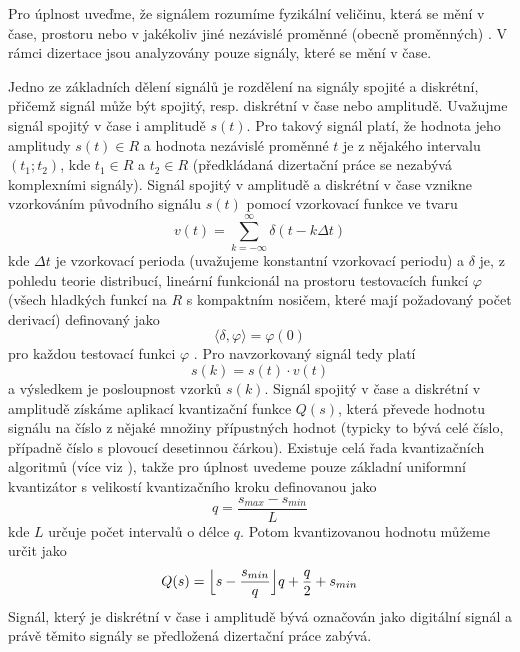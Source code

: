 Pro úplnost uveďme, že signálem rozumíme fyzikální veličinu, která se mění v čase, prostoru nebo v jakékoliv jiné nezávislé proměnné (obecně proměnných) \cite{proakis}. V rámci dizertace jsou analyzovány pouze signály, které se mění v čase.
\par
Jedno ze základních dělení signálů je rozdělení na signály spojité a diskrétní, přičemž signál může být spojitý, resp. diskrétní v čase nebo amplitudě. Uvažujme signál spojitý v čase i amplitudě $s(t)$. Pro takový signál platí, že hodnota jeho amplitudy $s(t)\in R$ a hodnota nezávislé proměnné $t$ je z nějakého intervalu $(t_1;t_2)$, kde $t_1 \in R$ a $t_2 \in R$ (předkládaná dizertační práce se nezabývá komplexními signály). Signál spojitý v amplitudě a diskrétní v čase vznikne vzorkováním původního signálu $s(t)$ pomocí vzorkovací funkce ve tvaru
\begin{equation}
v(t)=\sum_{k=-\infty}^{\infty}\delta(t-k\Delta t)
\end{equation}
kde $\Delta t$ je vzorkovací perioda (uvažujeme konstantní vzorkovací periodu) a $\delta$ je, z pohledu teorie distribucí, lineární funkcionál na prostoru testovacích funkcí $\varphi$ (všech hladkých funkcí na $R$ s kompaktním nosičem, které mají požadovaný počet derivací) definovaný jako
\begin{equation}
\langle \delta,\varphi\rangle=\varphi(0)
\end{equation}
pro každou testovací funkci $\varphi$ \cite{dirac}. Pro navzorkovaný signál tedy platí
\begin{equation}
s(k)=s(t)\cdot v(t)
\end{equation}
a výsledkem je posloupnost vzorků $s(k)$. Signál spojitý v čase a diskrétní v amplitudě získáme aplikací kvantizační funkce $Q(s)$, která převede hodnotu signálu  na číslo z nějaké množiny přípustných hodnot (typicky to bývá celé číslo, případně číslo s plovoucí desetinnou čárkou). Existuje celá řada kvantizačních algoritmů (více viz \cite{kvantizace}), takže pro úplnost uvedeme pouze základní uniformní kvantizátor s velikostí kvantizačního kroku definovanou jako
\begin{equation}
q=\frac{s_{max}-s_{min}}{L}
\end{equation}
kde $L$ určuje počet intervalů o délce $q$. Potom kvantizovanou hodnotu můžeme určit jako
\begin{equation}
Q(s)=\Bigl \lfloor s-\frac{s_{min}}{q}\Bigr \rfloor q+\frac{q}{2}+s_{min}
\end{equation}
Signál, který je diskrétní v čase i amplitudě bývá označován jako digitální signál a právě těmito signály se předložená dizertační práce zabývá.

